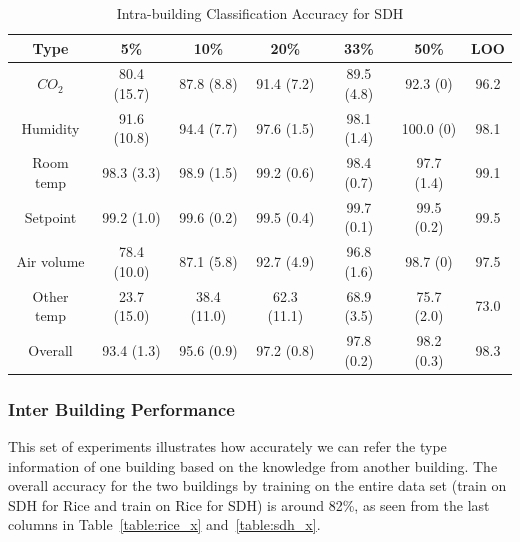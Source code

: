 \begin{table}[ht!]
\caption{Intra-building Classification Accuracy for SDH}
\centering %
\begin{tabular}{c | c | c | c | c | c | c}%
\hline %
Type & 5\% & 10\% & 20\% & 33\% & 50\% & LOO\\ %
\hline\hline %
$CO_{2}$ & 80.4 (15.7) & 87.8 (8.8) & 91.4 (7.2) & 89.5 (4.8) & 92.3 (0) & 96.2\\ \hline
Humidity & 91.6 (10.8) & 94.4 (7.7) & 97.6 (1.5) & 98.1 (1.4) & 100.0 (0) & 98.1\\ \hline
Room temp & 98.3 (3.3) & 98.9 (1.5) & 99.2 (0.6) & 98.4 (0.7) & 97.7 (1.4) & 99.1\\ \hline
Setpoint & 99.2 (1.0) & 99.6 (0.2) & 99.5 (0.4) & 99.7 (0.1) & 99.5 (0.2) & 99.5\\ \hline
Air volume & 78.4 (10.0) & 87.1 (5.8) & 92.7 (4.9) & 96.8 (1.6) & 98.7 (0) & 97.5\\ \hline
Other temp & 23.7 (15.0) & 38.4 (11.0) & 62.3 (11.1) & 68.9 (3.5) & 75.7 (2.0) & 73.0\\ \hline
Overall & 93.4 (1.3) & 95.6 (0.9) & 97.2 (0.8) & 97.8 (0.2) & 98.2 (0.3) & 98.3\\ \hline
\end{tabular}
\label{table:sdh} %
\end{table}

\subsubsection{Inter Building Performance}
This set of experiments illustrates how accurately we can refer the type information of one building based on the knowledge from another building. The overall accuracy for the two buildings by training on the entire data set (train on SDH for Rice and train on Rice for SDH) is around 82\%, as seen from the last columns in Table~\ref{table:rice_x} and~\ref{table:sdh_x}.

